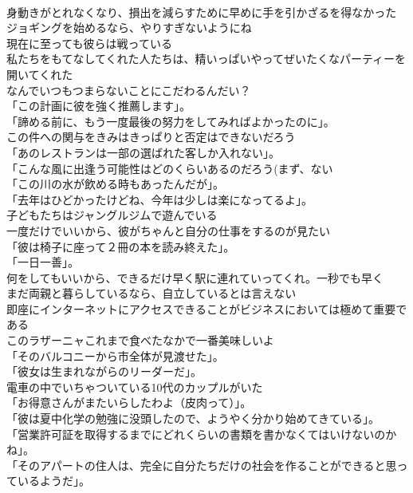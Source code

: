 \documentclass[8pt]{extreport}
\begin{document}
\begin{CJK}{UTF8}{min}
\\	身動きがとれなくなり、損出を減らすために早めに手を引かざるを得なかった	
\\	ジョギングを始めるなら、やりすぎないようにね	
\\	現在に至っても彼らは戦っている	
\\	私たちをもてなしてくれた人たちは、精いっぱいやってぜいたくなパーティーを開いてくれた	
\\	なんでいつもつまらないことにこだわるんだい？	
\\	「この計画に彼を強く推薦します」。	
\\	「諦める前に、もう一度最後の努力をしてみればよかったのに」。	
\\	この件への関与をきみはきっぱりと否定はできないだろう	
\\	「あのレストランは一部の選ばれた客しか入れない」。	
\\	「こんな風に出逢う可能性はどのくらいあるのだろう(まず、ない 
\\	「この川の水が飲める時もあったんだが」。	
\\	「去年はひどかったけどね、今年は少しは楽になってるよ」。	
\\	子どもたちはジャングルジムで遊んでいる	
\\	一度だけでいいから、彼がちゃんと自分の仕事をするのが見たい	
\\	「彼は椅子に座って２冊の本を読み終えた」。	
\\	「一日一善」。	
\\	何をしてもいいから、できるだけ早く駅に連れていってくれ。一秒でも早く	
\\	まだ両親と暮らしているなら、自立しているとは言えない	
\\	即座にインターネットにアクセスできることがビジネスにおいては極めて重要である	
\\	このラザーニャこれまで食べたなかで一番美味しいよ	
\\	「そのバルコニーから市全体が見渡せた」。	
\\	「彼女は生まれながらのリーダーだ」。	
\\	電車の中でいちゃついている10代のカップルがいた	
\\	「お得意さんがまたいらしたわよ（皮肉って）」。	
\\	「彼は夏中化学の勉強に没頭したので、ようやく分かり始めてきている」。	
\\	「営業許可証を取得するまでにどれくらいの書類を書かなくてはいけないのかね」。	
\\	「そのアパートの住人は、完全に自分たちだけの社会を作ることができると思っているようだ」。	

\end{CJK}
\end{document}
